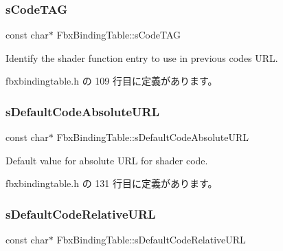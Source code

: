 \subsubsection{\texorpdfstring{s\+Code\+T\+AG}{sCodeTAG}}
{\footnotesize\ttfamily const char$\ast$ Fbx\+Binding\+Table\+::s\+Code\+T\+AG\hspace{0.3cm}{\ttfamily [static]}}



Identify the shader function entry to use in previous code\textquotesingle{}s U\+RL. 



 fbxbindingtable.\+h の 109 行目に定義があります。

\mbox{\label{class_fbx_binding_table_aa2ed12fb4230daa72892ec1ab6ee0c86}} 
\subsubsection{\texorpdfstring{s\+Default\+Code\+Absolute\+U\+RL}{sDefaultCodeAbsoluteURL}}
{\footnotesize\ttfamily const char$\ast$ Fbx\+Binding\+Table\+::s\+Default\+Code\+Absolute\+U\+RL\hspace{0.3cm}{\ttfamily [static]}}



Default value for absolute U\+RL for shader code. 



 fbxbindingtable.\+h の 131 行目に定義があります。

\mbox{\label{class_fbx_binding_table_ac40c0a63d26e730175dfac64a58a8332}} 
\subsubsection{\texorpdfstring{s\+Default\+Code\+Relative\+U\+RL}{sDefaultCodeRelativeURL}}
{\footnotesize\ttfamily const char$\ast$ Fbx\+Binding\+Table\+::s\+Default\+Code\+Relative\+U\+RL\hspace{0.3cm}{\ttfamily [static]}}



